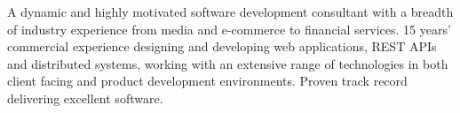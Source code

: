 

\begin{cvparagraph}

A dynamic and highly motivated software development consultant with a breadth of industry experience from media and e-commerce to financial services. 15 years' commercial experience designing and developing web applications, REST APIs and distributed systems, working with an extensive range of technologies in both client facing and product development environments. Proven track record delivering excellent software.
\end{cvparagraph}
